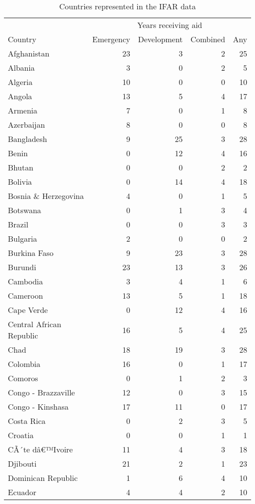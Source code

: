 \begingroup\fontsize{10}{12}\selectfont

\begin{longtable}[t]{lrrrr}
\caption{Countries represented in the IFAR data}\\
\toprule
\multicolumn{1}{c}{ } & \multicolumn{4}{c}{Years receiving aid} \\
\cmidrule(l{3pt}r{3pt}){2-5}
Country & Emergency & Development & Combined & Any\\
\midrule
Afghanistan & 23 & 3 & 2 & 25\\
Albania & 3 & 0 & 2 & 5\\
Algeria & 10 & 0 & 0 & 10\\
Angola & 13 & 5 & 4 & 17\\
Armenia & 7 & 0 & 1 & 8\\
Azerbaijan & 8 & 0 & 0 & 8\\
Bangladesh & 9 & 25 & 3 & 28\\
Benin & 0 & 12 & 4 & 16\\
Bhutan & 0 & 0 & 2 & 2\\
Bolivia & 0 & 14 & 4 & 18\\
Bosnia \& Herzegovina & 4 & 0 & 1 & 5\\
Botswana & 0 & 1 & 3 & 4\\
Brazil & 0 & 0 & 3 & 3\\
Bulgaria & 2 & 0 & 0 & 2\\
Burkina Faso & 9 & 23 & 3 & 28\\
Burundi & 23 & 13 & 3 & 26\\
Cambodia & 3 & 4 & 1 & 6\\
Cameroon & 13 & 5 & 1 & 18\\
Cape Verde & 0 & 12 & 4 & 16\\
Central African Republic & 16 & 5 & 4 & 25\\
Chad & 18 & 19 & 3 & 28\\
Colombia & 16 & 0 & 1 & 17\\
Comoros & 0 & 1 & 2 & 3\\
Congo - Brazzaville & 12 & 0 & 3 & 15\\
Congo - Kinshasa & 17 & 11 & 0 & 17\\
Costa Rica & 0 & 2 & 3 & 5\\
Croatia & 0 & 0 & 1 & 1\\
CÃ´te dâ€™Ivoire & 11 & 4 & 3 & 18\\
Djibouti & 21 & 2 & 1 & 23\\
Dominican Republic & 1 & 6 & 4 & 10\\
Ecuador & 4 & 4 & 2 & 10\\

\end{longtable}
